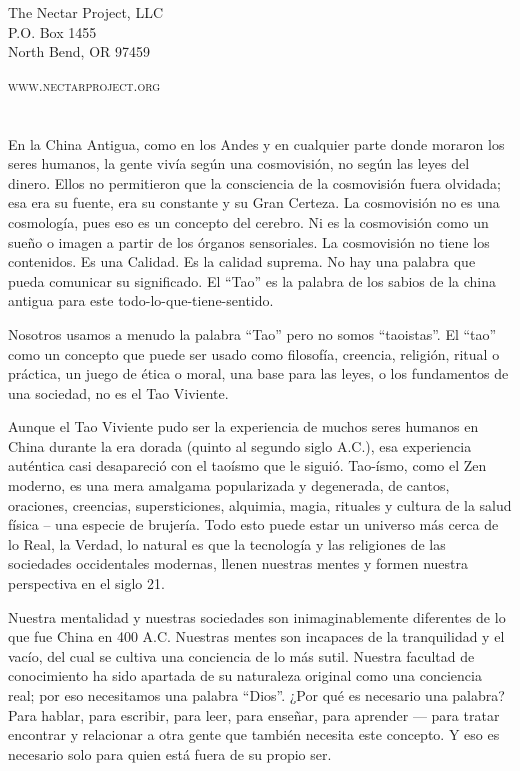 \documentclass[hidelinks]{memoir}
\begin{document}
		\par The Nectar Project, LLC\\
		P.O. Box 1455\\
		North Bend, OR 97459
		
		
		\par \textsc{www.nectarproject.org}
		
			
\mainmatter				
	
	\chapter*{}
	
	En la China Antigua, como en los Andes y en cualquier parte donde
	moraron los seres humanos, la gente vivía según una cosmovisión, no
	según las leyes del dinero. Ellos no permitieron que la consciencia de
	la cosmovisión fuera olvidada; esa era su fuente, era su constante y su
	Gran Certeza. La cosmovisión no es una cosmología, pues eso es un
	concepto del cerebro. Ni es la cosmovisión como un sueño o imagen a
	partir de los órganos sensoriales. La cosmovisión no tiene los
	contenidos. Es una Calidad. Es la calidad suprema. No hay una palabra
	que pueda comunicar su significado. El ``Tao'' es la palabra de los
	sabios de la china antigua para este todo-lo-que-tiene-sentido.
	
	Nosotros usamos a menudo la palabra ``Tao'' pero no somos ``taoistas''. El
	``tao'' como un concepto que puede ser usado como filosofía, creencia,
	religión, ritual o práctica, un juego de ética o moral, una base para
	las leyes, o los fundamentos de una sociedad, no es el Tao Viviente.
	
	Aunque el Tao Viviente pudo ser la experiencia de muchos seres humanos
	en China durante la era dorada (quinto al segundo siglo A.C.), esa
	experiencia auténtica casi desapareció con el taoísmo que le siguió.
	Tao-ísmo, como el Zen moderno, es una mera amalgama popularizada y
	degenerada, de cantos, oraciones, creencias, supersticiones, alquimia,
	magia, rituales y cultura de la salud física -- una especie de brujería.
	Todo esto puede estar un universo más cerca de lo Real, la Verdad, lo
	natural es que la tecnología y las religiones de las sociedades
	occidentales modernas, llenen nuestras mentes y formen nuestra
	perspectiva en el siglo 21.
	
	Nuestra mentalidad y nuestras sociedades son inimaginablemente
	diferentes de lo que fue China en 400 A.C. Nuestras mentes son incapaces
	de la tranquilidad y el vacío, del cual se cultiva una conciencia de lo
	más sutil. Nuestra facultad de conocimiento ha sido apartada de su
	naturaleza original como una conciencia real; por eso necesitamos una
	palabra ``Dios''. ¿Por qué es necesario una palabra? Para hablar, para
	escribir, para leer, para enseñar, para aprender --- para tratar
	encontrar y relacionar a otra gente que también necesita este concepto.
	Y eso es necesario solo para quien está fuera de su propio ser.
	
\end{document}
